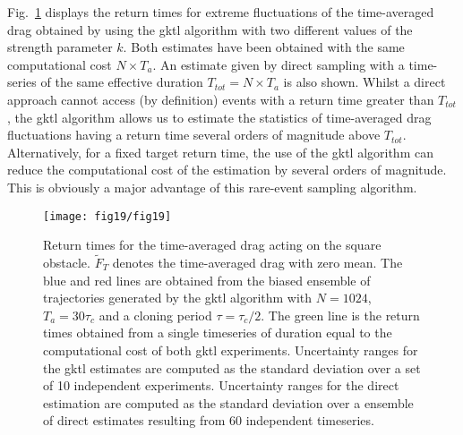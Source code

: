 Fig.~\ref{fig:return_times_gktl} displays the return times for extreme fluctuations of the time-averaged drag obtained by using the \ac{gktl} algorithm with two different values of the strength parameter $k$.  
%
Both estimates have been obtained with the same computational cost $N\times T_a$.
An estimate given by direct sampling with a time-series of the same effective duration $T_{tot}=N\times T_a$ is also shown. 
Whilst a direct approach cannot access (by definition) events with a return time greater than $T_{tot}$, the \ac{gktl} algorithm allows us to estimate the statistics of time-averaged drag fluctuations having a return time several orders of magnitude above $T_{tot}$. Alternatively, for a fixed target return time, the use of the \ac{gktl} algorithm can reduce the computational cost of the estimation by several orders of magnitude. This is  obviously a major advantage of this rare-event sampling algorithm. 
%
\begin{figure}
	\centering
	\texttt{[image: fig19/fig19]}
	\caption{\label{fig:return_times_gktl} Return times for the time-averaged drag acting on the square obstacle. $\tilde{F}_T$ denotes the time-averaged drag with zero mean. The blue and red lines are obtained from the biased ensemble of trajectories generated by the \ac{gktl} algorithm with $N=1024$, $T_a=30\tau_c$ and a cloning period $\tau=\tau_c/2$. The green line is the return times obtained from a single timeseries of duration equal to the computational cost of both \ac{gktl} experiments. Uncertainty ranges for the \ac{gktl} estimates are computed as the standard deviation over a set of 10 independent experiments. Uncertainty ranges for the direct estimation are computed as the standard deviation over a ensemble of direct estimates resulting from 60 independent timeseries.}
\end{figure}